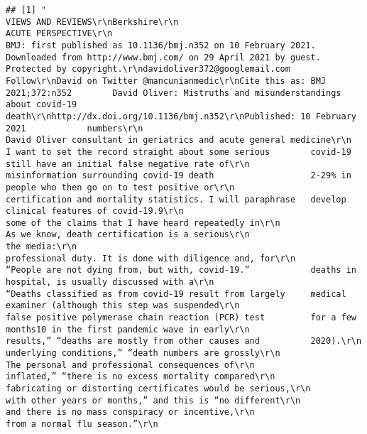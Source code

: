 \documentclass[
]{book}
\begin{document}
\begin{verbatim}
## [1] "                                                                                                                                  VIEWS AND REVIEWS\r\nBerkshire\r\n                                       ACUTE PERSPECTIVE\r\n                                                                                                                                                                                 BMJ: first published as 10.1136/bmj.n352 on 10 February 2021. Downloaded from http://www.bmj.com/ on 29 April 2021 by guest. Protected by copyright.\r\ndavidoliver372@googlemail.com Follow\r\nDavid on Twitter @mancunianmedic\r\nCite this as: BMJ 2021;372:n352        David Oliver: Mistruths and misunderstandings about covid-19 death\r\nhttp://dx.doi.org/10.1136/bmj.n352\r\nPublished: 10 February 2021            numbers\r\n                                       David Oliver consultant in geriatrics and acute general medicine\r\n                                       I want to set the record straight about some serious        covid-19 still have an initial false negative rate of\r\n                                       misinformation surrounding covid-19 death                   2-29% in people who then go on to test positive or\r\n                                       certification and mortality statistics. I will paraphrase   develop clinical features of covid-19.9\r\n                                       some of the claims that I have heard repeatedly in\r\n                                                                                                   As we know, death certification is a serious\r\n                                       the media:\r\n                                                                                                   professional duty. It is done with diligence and, for\r\n                                       “People are not dying from, but with, covid-19.”            deaths in hospital, is usually discussed with a\r\n                                       “Deaths classified as from covid-19 result from largely     medical examiner (although this step was suspended\r\n                                       false positive polymerase chain reaction (PCR) test         for a few months10 in the first pandemic wave in early\r\n                                       results,” “deaths are mostly from other causes and          2020).\r\n                                       underlying conditions,” “death numbers are grossly\r\n                                                                                                   The personal and professional consequences of\r\n                                       inflated,” “there is no excess mortality compared\r\n                                                                                                   fabricating or distorting certificates would be serious,\r\n                                       with other years or months,” and this is “no different\r\n                                                                                                   and there is no mass conspiracy or incentive,\r\n                                       from a normal flu season.”\r\n                                                                                                   
\end{verbatim}
\end{document}
